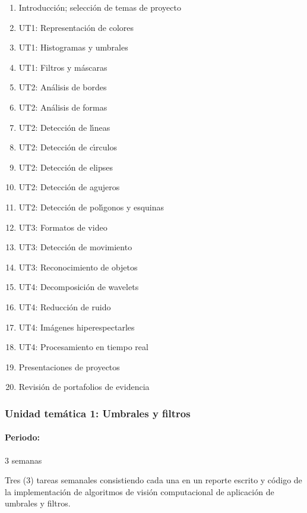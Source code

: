 \begin{enumerate}[itemsep=-3pt]
\item{Introducci\'{o}n; selecci\'{o}n de temas de proyecto}
\item{UT1: Representaci\'{o}n de colores}
\item{UT1: Histogramas y umbrales}
\item{UT1: Filtros y m\'{a}scaras}
\item{UT2: An\'{a}lisis de bordes}
\item{UT2: An\'{a}lisis de formas}
\item{UT2: Detecci\'{o}n de l\'{\i}neas}
\item{UT2: Detecci\'{o}n de c\'{\i}rculos}
\item{UT2: Detecci\'{o}n de elipses}
\item{UT2: Detecci\'{o}n de agujeros}
\item{UT2: Detecci\'{o}n de pol\'{\i}gonos y esquinas}
\item{UT3: Formatos de video}
\item{UT3: Detecci\'{o}n de movimiento}
\item{UT3: Reconocimiento de objetos}
\item{UT4: Decomposici\'{o}n de wavelets}
\item{UT4: Reducci\'{o}n de ruido}
\item{UT4: Im\'{a}genes hiperespectarles}
\item{UT4: Procesamiento en tiempo real}
\item{Presentaciones de proyectos}
\item{Revisi\'{o}n de portafolios de evidencia}
\end{enumerate}

\newpage

\subsubsection{Unidad tem\'{a}tica 1:  Umbrales y filtros}

\paragraph{Periodo:} 3 semanas



Tres (3) tareas semanales consistiendo cada una en un reporte escrito
y c\'{o}digo de la implementaci\'{o}n de algoritmos de visi\'{o}n
computacional de aplicaci\'{o}n de umbrales y filtros.

